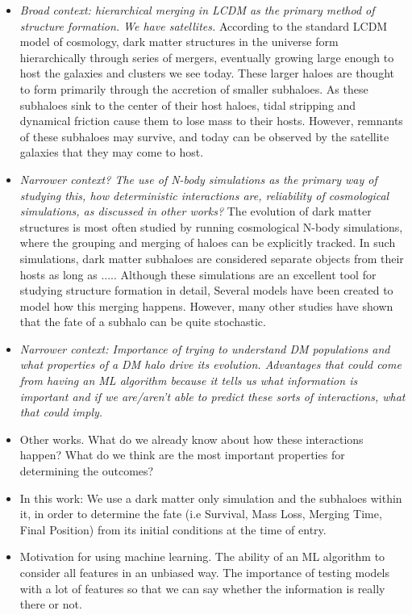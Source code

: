 \documentclass[fleqn,usenatbib]{mnras}
\begin{document}
\begin{itemize}
  \item \textit{Broad context: hierarchical merging in LCDM as the primary method of structure formation. We have satellites.}
  According to the standard LCDM model of cosmology, dark matter structures in the universe form hierarchically through series of mergers, eventually growing large enough to host the galaxies and clusters we see today. These larger haloes are thought to form primarily through the accretion of smaller subhaloes. As these subhaloes sink to the center of their host haloes, tidal stripping and dynamical friction cause them to lose mass to their hosts. However, remnants of these subhaloes may survive, and today can be observed by the satellite galaxies that they may come to host.
  \item \textit{Narrower context? The use of N-body simulations as the primary way of studying this, how deterministic interactions are, reliability of cosmological simulations, as discussed in other works?}
  The evolution of dark matter structures is most often studied by running cosmological N-body simulations, where the grouping and merging of haloes can be explicitly tracked. In such simulations, dark matter subhaloes are considered separate objects from their hosts as long as ..... Although these simulations are an excellent tool for studying structure formation in detail, Several models have been created to model how this merging happens. However, many other studies have shown that the fate of a subhalo can be quite stochastic.
  \item \textit{Narrower context: Importance of trying to understand DM populations and what properties of a DM halo drive its evolution. Advantages that could come from having an ML algorithm because it tells us what information is important and if we are/aren't able to predict these sorts of interactions, what that could imply.}
  \item Other works. What do we already know about how these interactions happen? What do we think are the most important properties for determining the outcomes?
  \item In this work: We use a dark matter only simulation and the subhaloes within it, in order to determine the fate (i.e Survival, Mass Loss, Merging Time, Final Position) from its initial conditions at the time of entry.
  \item Motivation for using machine learning. The ability of an ML algorithm to consider all features in an unbiased way. The importance of testing models with a lot of features so that we can say whether the information is really there or not.

\end{itemize}
\end{document}

